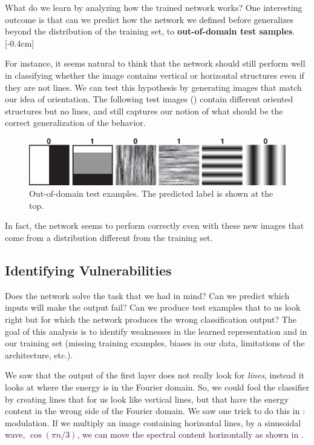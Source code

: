 What do we learn by analyzing how the trained network works? One interesting outcome is that can we predict how the network we defined before generalizes beyond the distribution of the training set, to {\bf out-of-domain test samples}.
[-0.4cm]

For instance, it seems natural to think that the network should still perform well in classifying whether the image contains vertical or horizontal structures even if they are not lines. We can test this hypothesis by generating images that match our idea of orientation. The following test images (\fig{\ref{fig:ref:convolutional_neural_nets:oriented_bars_cnn_generalization}}) contain different oriented structures but no lines, and still captures our notion of what should be the correct generalization of the behavior.

\begin{figure}
    \includegraphics[width=1\linewidth]{./figures/convolutional_neural_nets/oriented_bars_cnn_generalization.eps}
    \caption{Out-of-domain test examples. The predicted label is shown at the top.}
    \label{fig:ref:convolutional_neural_nets:oriented_bars_cnn_generalization}
\end{figure}

In fact, the network seems to perform correctly even with these new images that come from a distribution different from the training set.

\subsection{Identifying Vulnerabilities}

Does the network solve the task that we had in mind? Can we predict which inputs will make the output fail? Can we produce test examples that to us look right but for which the network produces the wrong classification output? The goal of this analysis is to identify weaknesses in the learned representation and in our training set (missing training examples, biases in our data, limitations of the architecture, etc.).

We saw that the output of the first layer does not really look for {\em lines}, instead it looks at where the energy is in the Fourier domain. So, we could fool the classifier by creating lines that for us look like vertical lines, but that have the energy content in the wrong side of the Fourier domain. We saw one trick to do this in \chap{\ref{chapter:fourier_analysis}}: modulation. If we multiply an image containing horizontal lines, by a sinusoidal wave, $\cos (\pi n / 3)$, we can move the spectral content horizontally as shown in \fig{\ref{fig:convolutional_neural_nets:oriented_bars_cnn_test_adversarial_creation1}}.

